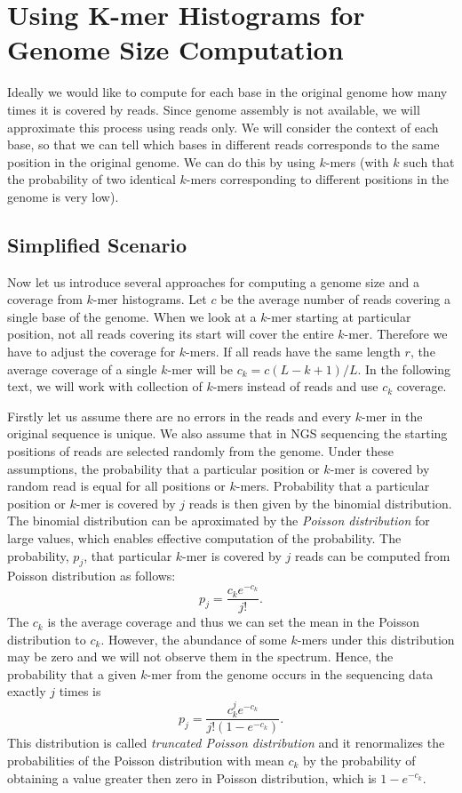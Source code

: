 \section[K-mer Histograms]{Using K-mer Histograms for Genome Size Computation}\label{sec:kmerhist}

Ideally we would like to compute for each base in the original genome how many times it is covered by reads. Since genome assembly is not available, we will approximate this process using reads only. We will consider the context of each base, so that we can tell which bases in different reads corresponds to the same position in the original genome. We can do this by using $k$-mers (with $k$ such that the probability of two identical $k$-mers corresponding to different positions in the genome is very low).

\subsection{Simplified Scenario}

Now let us introduce several approaches for computing a genome size and a coverage from $k$-mer histograms.
Let $c$ be the average number of reads covering a single base of the genome. When we look at a $k$-mer starting at particular position, not all reads covering its start will cover the entire $k$-mer.
Therefore we have to adjust the coverage for $k$-mers.
If all reads have the same length $r$, the average coverage of a single $k$-mer will be $c_k = c (L - k + 1)/L$.
In the following text, we will work with collection of $k$-mers instead of reads and use $c_k$ coverage.

Firstly let us assume there are no errors in the reads and every $k$-mer in the original sequence is unique.
We also assume that in NGS sequencing the starting positions of reads are selected randomly from the genome.
Under these assumptions, the probability that a particular position or $k$-mer is covered by random read is equal for all positions or $k$-mers. Probability that a particular position or $k$-mer is covered by $j$ reads is then given by the binomial distribution. The binomial distribution can be aproximated by the \emph{Poisson distribution} for large values, which enables effective computation of the probability.
The probability, $p_j$, that particular $k$-mer is covered by $j$ reads can be computed from Poisson distribution as follows:
$$ p_j =  \frac{c_k e^{-c_k}}{j!}.$$
The $c_k$ is the average coverage and thus we can set the mean in the Poisson distribution to $c_k$.
However, the abundance of some $k$-mers under this distribution may be zero and we will not observe them in the spectrum. Hence, the probability that a given $k$-mer from the genome occurs in the sequencing data exactly $j$ times is $$p_j = \frac{c_k^j e^{-c_k}}{j! (1-e^{-c_k})}.$$
This distribution is called \emph{truncated Poisson distribution} and it renormalizes the probabilities of the Poisson distribution with mean $c_k$ by the probability of obtaining a value greater then zero in Poisson distribution, which is $1-e^{-c_k}$.

